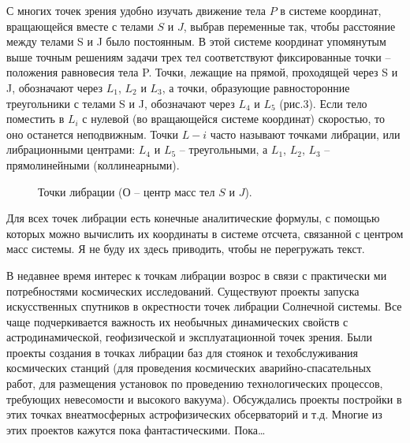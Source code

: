 \documentclass[a4paper, 12pt]{article}%
\begin{document}
С многих точек зрения удобно изучать движение тела $P$ в системе координат, вращающейся вместе с телами $S$ и $J$, выбрав переменные так, чтобы расстояние между телами S и J было постоянным. В этой системе координат упомянутым выше точным решениям задачи трех тел соответствуют фиксированные точки – положения равновесия тела P. Точки, лежащие на прямой, проходящей через S и J, обозначают через $L_1$, $L_2$ и $L_3$, а точки, образующие равносторонние треугольники с телами S и J, обозначают через $L_4$ и $L_5$ (рис.3). Если тело  поместить в $L_i$ с нулевой (во вращающейся системе координат) скоростью, то оно останется неподвижным. Точки $L-i$ часто называют точками либрации, или либрационными центрами: $L_4$ и $L_5$ -- треугольными, а $L_1$, $L_2$, $L_3$ -- прямолинейными (коллинеарными). 

\begin{figure}[h!]
\caption{ Точки либрации ($О$ – центр масс тел $S$ и $J$).}
\end{figure}

Для всех точек либрации есть конечные аналитические формулы, с помощью которых можно вычислить их координаты в системе отсчета, связанной с центром масс системы. Я не буду их здесь приводить, чтобы не перегружать текст. 

В недавнее время интерес к точкам либрации возрос в связи с практически ми потребностями космических исследований. Существуют проекты запуска искусственных спутников в
окрестности точек либрации Солнечной системы. Все чаще подчеркивается важность их необычных динамических свойств с астродинамической, геофизической и эксплуатационной
точек зрения.  Были проекты создания в точках либрации баз для стоянок и техобслуживания космических станций (для проведения космических аварийно-спасательных работ, для размещения
установок по проведению технологических процессов, требующих невесомости и высокого
вакуума). Обсуждались проекты постройки в этих точках внеатмосферных астрофизических
обсерваторий и т.д. Многие из этих проектов кажутся пока фантастическими. Пока… 
\end{document}
